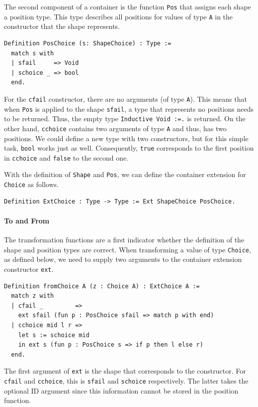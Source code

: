 \documentclass[a4paper, 11pt, fleqn, twoside, abstract=on]{scrreprt}
\newcommand{\hinl}[1]{\texttt{#1}}
\newcommand{\cinl}[1]{\texttt{#1}}
\begin{document}
The second component of a container is the function \cinl{Pos} that assigns each shape a position type.
This type describes all positions for values of type \cinl{A} in the constructor that the shape represents.

\begin{verbatim}
Definition PosChoice (s: ShapeChoice) : Type :=
  match s with
  | sfail     => Void
  | schoice _ => bool
  end.
\end{verbatim}

For the \cinl{cfail} constructor, there are no arguments (of type \cinl{A}).
This means that when \cinl{Pos} is applied to the shape \cinl{sfail}, a type that represents no positions needs to be returned.
Thus, the empty type \cinl{Inductive Void :=.} is returned.
On the other hand, \hinl{cchoice} contains two arguments of type \cinl{A} and thus, has two positions.
We could define a new type with two constructors, but for this simple task, \cinl{bool} works just as well.
Consequently, \cinl{true} corresponds to the first position in \cinl{cchoice} and \cinl{false} to the second one.

With the definition of \cinl{Shape} and \cinl{Pos}, we can define the container extension for \cinl{Choice} as follows.

\begin{verbatim}
Definition ExtChoice : Type -> Type := Ext ShapeChoice PosChoice.
\end{verbatim}

\paragraph{To and From}
The transformation functions are a first indicator whether the definition of the shape and position types are correct.
When transforming a value of type \cinl{Choice}, as defined below, we need to supply two arguments to the container extension constructor \cinl{ext}.

\begin{verbatim}
Definition fromChoice A (z : Choice A) : ExtChoice A :=
  match z with
  | cfail _         =>
    ext sfail (fun p : PosChoice sfail => match p with end)
  | cchoice mid l r =>
    let s := schoice mid
    in ext s (fun p : PosChoice s => if p then l else r)
  end.
\end{verbatim}
\noindent
The first argument of \cinl{ext} is the shape that corresponds to the constructor.
For \cinl{cfail} and \cinl{cchoice}, this is \cinl{sfail} and \cinl{schoice} respectively.
The latter takes the optional ID argument since this information cannot be stored in the position function.
\end{document}
